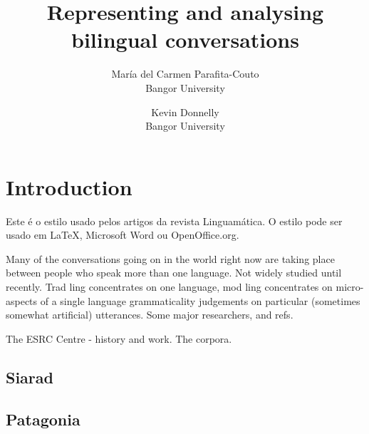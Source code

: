 \documentclass[a4paper, twocolumn, 11pt, twoside]{article}
\title{\textbf{Representing and analysing bilingual conversations}}
\author{
  María del Carmen Parafita-Couto\\
  Bangor University\\
  \email{maricarme@gmail.com} 
  \and 
  Kevin Donnelly\\
  Bangor University\\
  \email{kevin@dotmon.com}
}
\date{}
\begin{document}
\thispagestyle{empty}


\section{Introduction}

Este é o estilo usado pelos artigos da revista Linguamática. O estilo pode ser usado em \LaTeX \cite{latexcompanion}, Microsoft Word ou OpenOffice.org.

Many of the conversations going on in the world right now are taking place between people who speak more than one language.  Not widely studied until recently.  Trad ling concentrates on one language, mod ling concentrates on micro-aspects of a single language grammaticality judgements on particular (sometimes somewhat artificial) utterances.  Some major researchers, and refs.

The ESRC Centre - history and work.  The corpora.

\subsection{Siarad}

\subsection{Patagonia}
\end{document}

